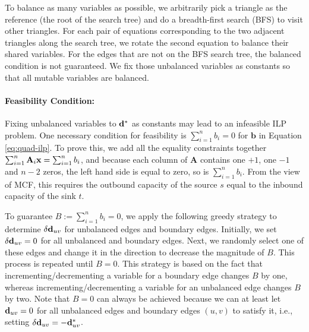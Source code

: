 To balance as many variables as possible, we arbitrarily pick a triangle as the reference (the root of the search tree) and do a breadth-first search (BFS) to visit other triangles. For each pair of equations corresponding to the two adjacent triangles along the search tree, we rotate the second equation to balance their shared variables. For the edges that are not on the BFS search tree, the balanced condition is not guaranteed.  We fix those unbalanced variables as constants so that all mutable variables are balanced.


\paragraph*{Feasibility Condition:} Fixing unbalanced variables to ${\mathbf{d}}^*$ as constants may lead to an infeasible ILP problem. One necessary condition for feasibility is $\sum_{i=1}^n b_i=0$ for $\mathbf{b}$ in Equation \eqref{eq:quad-ilp}.  To prove this, we add all the equality constraints together $\sum_{i=1}^n \mathbf{A}_i \mathbf{x} = \sum_{i=1}^n b_i$, and because each column of $\mathbf{A}$ contains one $+1$, one $-1$ and $n-2$ zeros, the left hand side is equal to zero, so is $\sum_{i=1}^n b_i$.  From the view of MCF, this requires the outbound capacity of the source $s$ equal to the inbound capacity of the sink $t$.

To guarantee $B:=\sum_{i=1}^n b_i=0$, we apply the following greedy strategy to determine $\delta \mathbf{d}_{uv}$ for unbalanced edges and boundary edges.  Initially, we set $\delta \mathbf{d}_{uv}=0$ for all unbalanced and boundary edges.  Next, we randomly select one of these edges and change it in the direction to decrease the magnitude of $B$. This process is repeated until $B=0$. This strategy is based on the fact that incrementing/decrementing a variable for a boundary edge changes $B$ by one, whereas incrementing/decrementing a variable for an unbalanced edge changes $B$ by two. Note that $B=0$ can always be achieved because we can at least let ${\mathbf{d}}_{uv}=0$ for all unbalanced edges and boundary edges $(u,v)$ to satisfy it, i.e., setting $\delta \mathbf{d}_{uv} = -{\mathbf{d}}^*_{uv}$.

